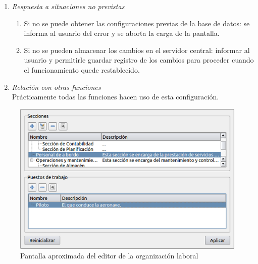 \begin{enumerate}
\begin{enumerate}
			\end{enumerate}
		\item \textit{Respuesta a situaciones no previstas}
			\begin{enumerate}
				\item Si no se puede obtener las configuraciones previas de la base de datos: se informa al usuario del error y se aborta la carga de la pantalla.
				\item Si no se pueden almacenar los cambios en el servidor central: informar al usuario y permitirle guardar registro de los cambios para proceder cuando el funcionamiento quede restablecido.
			\end{enumerate}
		\item \textit{Relación con otras funciones}\\
			Prácticamente todas las funciones hacen uso de esta configuración.
	\end{enumerate}

\begin{figure}[ht]\centering
	\includegraphics[scale=.6]{imagenes/OrgLaboral.png}
	\caption{Pantalla aproximada del editor de la organización laboral}
\end{figure}
